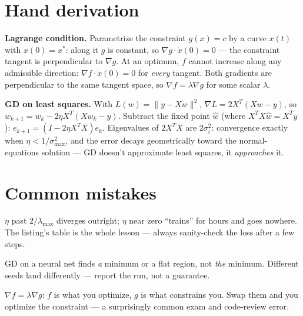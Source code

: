 \section{Hand derivation}\label{sec:handderiv14}

\textbf{Lagrange condition.} Parametrize the constraint $g(x)=c$ by a
curve $x(t)$ with $x(0)=x^{*}$: along it $g$ is constant, so
$\nabla g\cdot\dot x(0)=0$ --- the constraint tangent is perpendicular
to $\nabla g$. At an optimum, $f$ cannot increase along any admissible
direction: $\nabla f\cdot\dot x(0)=0$ for \emph{every} tangent. Both
gradients are perpendicular to the same tangent space, so
$\nabla f=\lambda\nabla g$ for some scalar $\lambda$.

\textbf{GD on least squares.} With $L(w)=\|y-Xw\|^2$,
$\nabla L=2X^T(Xw-y)$, so $w_{k+1}=w_k-2\eta X^T(Xw_k-y)$. Subtract
the fixed point $\hat w$ (where $X^TX\hat w=X^Ty$):
$e_{k+1}=(I-2\eta X^TX)e_k$. Eigenvalues of $2X^TX$ are
$2\sigma_i^2$: convergence exactly when $\eta<1/\sigma_{\max}^2$,
and the error decays geometrically toward the normal-equations
solution --- GD doesn't approximate least squares, it
\emph{approaches} it.

\section{Common mistakes}\label{sec:opt-mistakes}

\begin{tripwire}
$\eta$ past $2/\lambda_{\max}$ diverges outright; $\eta$ near zero
``trains'' for hours and goes nowhere. The listing's table is the whole
lesson --- always sanity-check the loss after a few steps.
\end{tripwire}

\begin{tripwire}
GD on a neural net finds \emph{a} minimum or a flat region, not
\emph{the} minimum. Different seeds land differently --- report the run,
not a guarantee.
\end{tripwire}

\begin{tripwire}
$\nabla f=\lambda\nabla g$: $f$ is what you optimize, $g$ is what
constrains you. Swap them and you optimize the constraint --- a
surprisingly common exam and code-review error.
\end{tripwire}

